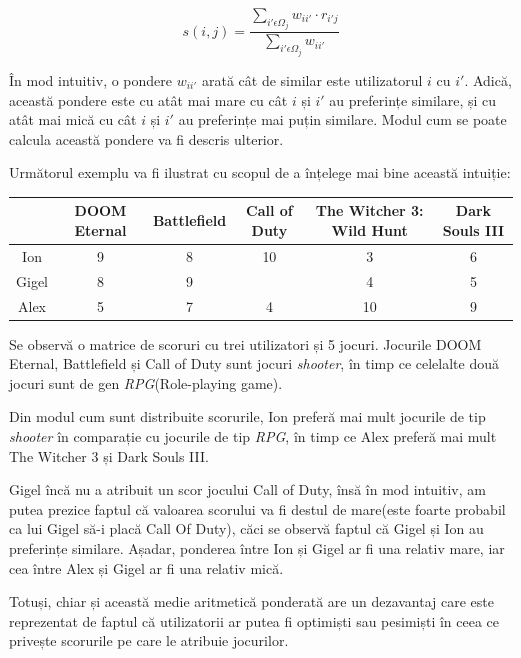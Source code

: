 \documentclass[12pt,a4paper]{report}
\begin{document}
\[ s(i, j) = \dfrac{ \sum\limits_{i' \epsilon \Omega_{j} } w_{ii'} \cdot r_{i'j} }{\sum\limits_{i' \epsilon \Omega_{j}} w_{ii'}}  \]

În mod intuitiv, o pondere \( w_{ii'}\) arată cât de similar este utilizatorul \( i \) cu \(i'\). Adică, această pondere este cu atât mai mare cu cât \( i \) și \( i' \) au preferințe similare, și cu atât mai mică cu cât \( i \) și \( i' \) au preferințe mai puțin similare. Modul cum se poate calcula această pondere va fi descris ulterior.

Următorul exemplu va fi ilustrat cu scopul de a înțelege mai bine această intuiție:

\begin{center}
\begin{adjustbox}{max size={\textwidth}{\textheight}}
\begin{tabular}{||c c c c c c||} 
 \hline
 & DOOM Eternal & Battlefield & Call of Duty & The Witcher 3: Wild Hunt & Dark Souls III \\ [0.5ex] 
 \hline\hline
 Ion & 9 & 8 & 10 & 3 & 6 \\ 
 \hline
 Gigel & 8 & 9 & & 4 & 5  \\
 \hline
 Alex & 5 & 7 & 4 & 10 & 9 \\
 \hline
\end{tabular}
\end{adjustbox}
\end{center}

Se observă o matrice de scoruri cu trei utilizatori și 5 jocuri. Jocurile DOOM Eternal, Battlefield și Call of Duty sunt jocuri \emph{shooter}, în timp ce celelalte două jocuri sunt de gen \emph{RPG}(Role-playing game).

Din modul cum sunt distribuite scorurile, Ion preferă mai mult jocurile de tip \emph{shooter} în comparație cu jocurile de tip \emph{RPG}, în timp ce Alex preferă mai mult The Witcher 3 și Dark Souls III.

Gigel încă nu a atribuit un scor jocului Call of Duty, însă în mod intuitiv, am putea prezice faptul că valoarea scorului va fi destul de mare(este foarte probabil ca lui Gigel să-i placă Call Of Duty), căci se observă faptul că Gigel și Ion au preferințe similare. Așadar, ponderea între Ion și Gigel ar fi una relativ mare, iar cea între Alex și Gigel ar fi una relativ mică.

\newpage

Totuși, chiar și această medie aritmetică ponderată are un dezavantaj care este reprezentat de faptul că utilizatorii ar putea fi optimiști sau pesimiști în ceea ce privește scorurile pe care le atribuie jocurilor. 
\end{document}
